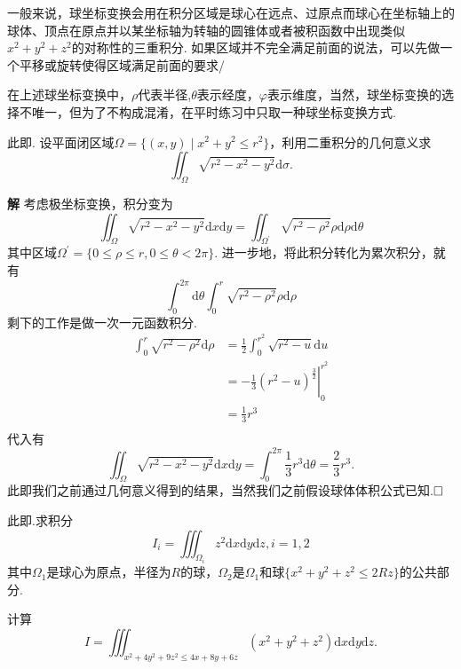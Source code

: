 \documentclass{ctexart}
\newenvironment{custom}[1]{\par\noindent \textbf{#1}\quad}{\par\vspace{1em}}
\begin{document}
一般来说，球坐标变换会用在积分区域是球心在远点、过原点而球心在坐标轴上的球体、顶点在原点并以某坐标轴为转轴的圆锥体或者被积函数中出现类似$x^{2}+y^{2}+z^{2}$的对称性的三重积分. 如果区域并不完全满足前面的说法，可以先做一个平移或旋转使得区域满足前面的要求/

在上述球坐标变换中，$\rho$代表半径,$\theta$表示经度，$\varphi$表示维度，当然，球坐标变换的选择不唯一，但为了不构成混淆，在平时练习中只取一种球坐标变换方式.

\begin{example}
此即\cite[第八章第一节习题1]{JC}. 设平面闭区域$\Omega=\{(x,y)\mid x^{2}+y^{2}\leqslant r^{2}\}$，利用二重积分的几何意义求
$$\iint_{\Omega}{\sqrt{r^{2}-x^{2}-y^{2}}\mathrm{d}\sigma}.$$
\end{example}

\begin{custom}{解}
考虑极坐标变换，积分变为
$$\iint_{\Omega}{\sqrt{r^{2}-x^{2}-y^{2}}\mathrm{d}x\mathrm{d}y}=\iint_{\Omega^{\prime}}{\sqrt{r^{2}-\rho^{2}}\rho\mathrm{d}\rho\mathrm{d}\theta}$$
其中区域$\Omega^{\prime}=\{0\leqslant \rho\leqslant r,0\leqslant \theta< 2\pi\}$. 进一步地，将此积分转化为累次积分，就有
$$\int_{0}^{2\pi}{\mathrm{d}\theta\int_{0}^{r}{\sqrt{r^{2}-\rho^{2}}\rho\mathrm{d}\rho}}$$
剩下的工作是做一次一元函数积分.
$$\begin{aligned}\int_{0}^{r}{\sqrt{r^{2}-\rho^{2}}\mathrm{d}\rho}&=\frac{1}{2}\int_{0}^{r^{2}}{\sqrt{r^{2}-u}\mathrm{d}u}\\
&=-\frac{1}{3}\left.(r^{2}-u)^{\frac{3}{2}}\right|_{0}^{r^{2}}\\
&=\frac{1}{3}r^{3}\\\end{aligned}$$
代入有
$$\iint_{\Omega}{\sqrt{r^{2}-x^{2}-y^{2}}\mathrm{d}x\mathrm{d}y}=\int_{0}^{2\pi}{\frac{1}{3}r^{3}\mathrm{d}\theta}=\frac{2}{3}r^{3}.$$
此即我们之前通过几何意义得到的结果，当然我们之前假设球体体积公式已知.$\hfill{\square}$
\end{custom}

\begin{example}
此即\cite[例题22.3.1]{XHM}.求积分
$$I_{i}=\iiint_{\Omega_{i}}{z^{2}\mathrm{d}x\mathrm{d}y\mathrm{d}z},i=1,2$$
其中$\Omega_{1}$是球心为原点，半径为$R$的球，$\Omega_{2}$是$\Omega_{1}$和球$\{x^{2}+y^{2}+z^{2}\leqslant 2Rz\}$的公共部分.
\end{example}

\begin{exercise}
计算
$$I=\iiint_{x^{2}+4y^{2}+9z^{2}\leqslant 4x+8y+6z}{(x^{2}+y^{2}+z^{2})\mathrm{d}x\mathrm{d}y}\mathrm{d}z.$$
\end{exercise}
\end{document}
